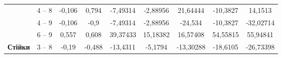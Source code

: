 \documentclass[a4paper,14pt]{article}
\begin{document}
\begin{landscape}
\begin{center}
\begin{longtable}{|c|c|c|c|c|c|c|c|c|}
                                             & 4 – 8                                & -0,106                                                                            & 0,794                                                                            & -7,49314                                                                                                         & -2,88956                                                                           & 21,64444                                                                           & -10,3827                      & 14,1513                       \\ \cline{2-9} 
                                             & 4 – 9                                & -0,106                                                                            & -0,9                                                                             & -7,49314                                                                                                         & -2,88956                                                                           & -24,534                                                                            & -10,3827                      & -32,02714                     \\ \cline{2-9} 
                                             & 6 – 9                                & 0,557                                                                             & 0,608                                                                            & 39,37433                                                                                                         & 15,18382                                                                           & 16,57408                                                                           & 54,55815                      & 55,94841                      \\ \hline
    \multirow{2}{*}{\textbf{Стійки}}         & 3 – 8                                & -0,19                                                                             & -0,488                                                                           & -13,4311                                                                                                         & -5,1794                                                                            & -13,30288                                                                          & -18,6105                      & -26,73398                     \\ \cline{2-9} 

\end{longtable}
\end{center}
\end{landscape}
\end{document}

